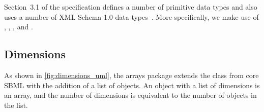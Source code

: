 Section~3.1 of the \sbmlthreecore specification defines a number of primitive data types and also uses a number of XML Schema 1.0 data types~\citep{biron:2000}.   More specifically, we make use of ,  ,  , and .







\subsection{Dimensions}
\label{sec:dimension}

As shown in \ref{fig:dimensions_uml}, the arrays package extends the \SBase class from core SBML with the addition of a list of \Dimension objects.   An object with a list of dimensions is an array, and the number of dimensions is equivalent to the number of \Dimension objects in the list.   %

